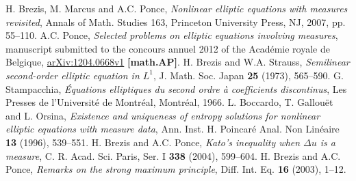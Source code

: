 \documentclass[a4paper, 11pt]{report}
\theoremstyle{definition}\newtheorem*{rmk}{Remark}
\begin{document}
\newpage
\begin{thebibliography}{99}
 H. Brezis, M. Marcus and A.C. Ponce, \textit{Nonlinear elliptic equations with measures revisited}, Annals of Math. Studies 163, Princeton University Press, NJ, 2007, pp. 55--110.
 A.C. Ponce, \textit{Selected problems on elliptic equations involving measures}, manuscript submitted to the concours annuel 2012 of the Acad\'emie royale de Belgique, \href{http://arxiv.org/abs/1204.0668v1}{arXiv:1204.0668v1} \textbf{[math.AP]}.
 H. Brezis and W.A. Strauss, \textit{Semilinear second-order elliptic equation in $L^1$}, J. Math. Soc. Japan \textbf{25} (1973), 565--590.
 G. Stampacchia, \textit{\'Equations elliptiques du second ordre \`a coefficients discontinus}, Les Presses de l'Universit\'e de Montr\'eal, Montr\'eal, 1966.
 L. Boccardo, T. Gallou\"et and L. Orsina, \textit{Existence and uniqueness of entropy solutions for nonlinear elliptic equations with measure data}, Ann. Inst. H. Poincar\'e Anal. Non Lin\'eaire \textbf{13} (1996), 539--551.
 H. Brezis and A.C. Ponce, \textit{Kato's inequality when $\Delta u$ is a measure}, C. R. Acad. Sci. Paris, Ser. I \textbf{338} (2004), 599--604.
 H. Brezis and A.C. Ponce, \textit{Remarks on the strong maximum principle}, Diff. Int. Eq. \textbf{16} (2003), 1--12.
\end{thebibliography}
\end{document}
